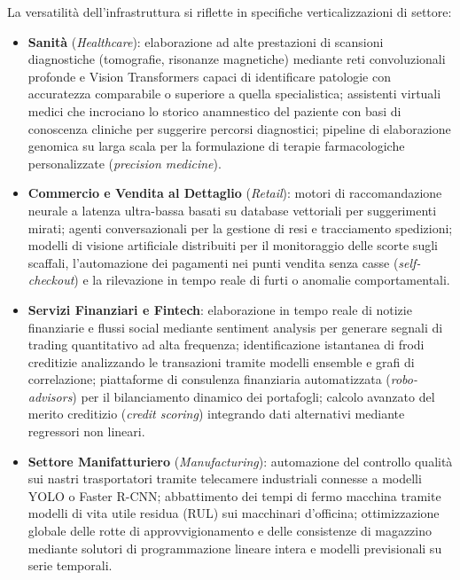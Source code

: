 \documentclass[11pt, a4paper]{article}
\begin{document}
La versatilità dell'infrastruttura si riflette in specifiche verticalizzazioni di settore:
\begin{itemize}
    \item \textbf{Sanità} (\emph{Healthcare}): elaborazione ad alte prestazioni di scansioni diagnostiche (tomografie, risonanze magnetiche) mediante reti convoluzionali profonde e Vision Transformers capaci di identificare patologie con accuratezza comparabile o superiore a quella specialistica; assistenti virtuali medici che incrociano lo storico anamnestico del paziente con basi di conoscenza cliniche per suggerire percorsi diagnostici; pipeline di elaborazione genomica su larga scala per la formulazione di terapie farmacologiche personalizzate (\emph{precision medicine}).
    \item \textbf{Commercio e Vendita al Dettaglio} (\emph{Retail}): motori di raccomandazione neurale a latenza ultra-bassa basati su database vettoriali per suggerimenti mirati; agenti conversazionali per la gestione di resi e tracciamento spedizioni; modelli di visione artificiale distribuiti per il monitoraggio delle scorte sugli scaffali, l'automazione dei pagamenti nei punti vendita senza casse (\emph{self-checkout}) e la rilevazione in tempo reale di furti o anomalie comportamentali.
    \item \textbf{Servizi Finanziari e Fintech}: elaborazione in tempo reale di notizie finanziarie e flussi social mediante sentiment analysis per generare segnali di trading quantitativo ad alta frequenza; identificazione istantanea di frodi creditizie analizzando le transazioni tramite modelli ensemble e grafi di correlazione; piattaforme di consulenza finanziaria automatizzata (\emph{robo-advisors}) per il bilanciamento dinamico dei portafogli; calcolo avanzato del merito creditizio (\emph{credit scoring}) integrando dati alternativi mediante regressori non lineari.
    \item \textbf{Settore Manifatturiero} (\emph{Manufacturing}): automazione del controllo qualità sui nastri trasportatori tramite telecamere industriali connesse a modelli YOLO o Faster R-CNN; abbattimento dei tempi di fermo macchina tramite modelli di vita utile residua (RUL) sui macchinari d'officina; ottimizzazione globale delle rotte di approvvigionamento e delle consistenze di magazzino mediante solutori di programmazione lineare intera e modelli previsionali su serie temporali.
\end{itemize}

\end{document}
